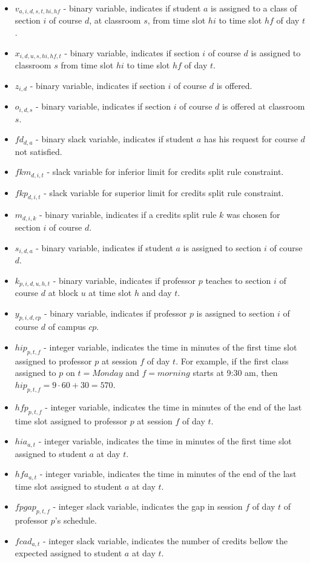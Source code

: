 \begin{itemize}
\item $v_{a,i,d,s,t,hi,hf}$ - binary variable, indicates if student $a$ is assigned to a class of section $i$ of course $d$, at classroom $s$, from time slot $hi$ to time slot $hf$ of day $t$. 
\item $x_{i,d,u,s,hi,hf,t}$ - binary variable, indicates if section $i$ of course $d$ is assigned to classroom $s$ from time slot $hi$ to time slot $hf$ of day $t$. 
\item $z_{i,d}$ - binary variable, indicates if section $i$ of course $d$ is offered. 
\item $o_{i,d,s}$ - binary variable, indicates if section $i$ of course $d$ is offered at classroom $s$. 
\item $fd_{d,a}$ - binary slack variable, indicates if student $a$ has his request for course $d$ not satisfied.
\item $fkm_{d,i,t}$ - slack variable for inferior limit for credits split rule constraint. 
\item $fkp_{d,i,t}$ - slack variable for superior limit for credits split rule constraint.
\item $m_{d,i,k}$ - binary variable, indicates if a credits split rule $k$ was chosen for section $i$ of course $d$.
\item $s_{i,d,a}$ - binary variable, indicates if student $a$ is assigned to section $i$ of course $d$.
\item $k_{p,i,d,u,h,t}$ - binary variable, indicates if professor $p$ teaches to section $i$ of course $d$ at block $u$ at time slot $h$ and day $t$.
\item $y_{p,i,d,cp}$ - binary variable, indicates if professor $p$ is assigned to section $i$ of course $d$ of campus $cp$.
\item $hip_{p,t,f}$ - integer variable, indicates the time in minutes of the first time slot assigned to professor $p$ at session $f$ of day $t$. For example, if the first class assigned to $p$ on $t=Monday$ and $f=morning$ starts at 9:30 am, then $hip_{p,t,f}=9\cdot 60 + 30 = 570$.
\item $hfp_{p,t,f}$ - integer variable, indicates the time in minutes of the end of the last time slot assigned to professor $p$ at session $f$ of day $t$.
\item $hia_{a,t}$ - integer variable, indicates the time in minutes of the first time slot assigned to student $a$ at day $t$.
\item $hfa_{a,t}$ - integer variable, indicates the time in minutes of the end of the last time slot assigned to student $a$ at day $t$.
\item $fpgap_{p,t,f}$ - integer slack variable, indicates the gap in session $f$ of day $t$ of professor $p$'s schedule.
\item $fcad_{a,t}$ - integer slack variable, indicates the number of credits bellow the expected assigned to student $a$ at day $t$.
\end{itemize}


